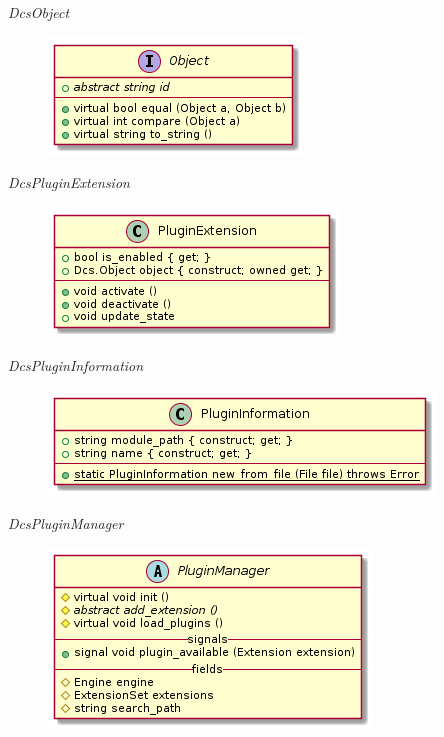       \emph{DcsObject}

        \begin{figure}[H]
          \includegraphics{figures/design/class/core/object}
        \end{figure}

      \emph{DcsPluginExtension}

        \begin{figure}[H]
          \includegraphics{figures/design/class/core/plugin-extension}
        \end{figure}

      \emph{DcsPluginInformation}

        \begin{figure}[H]
          \includegraphics{figures/design/class/core/plugin-information}
        \end{figure}

      \emph{DcsPluginManager}

        \begin{figure}[H]
          \includegraphics{figures/design/class/core/plugin-manager}
        \end{figure}

